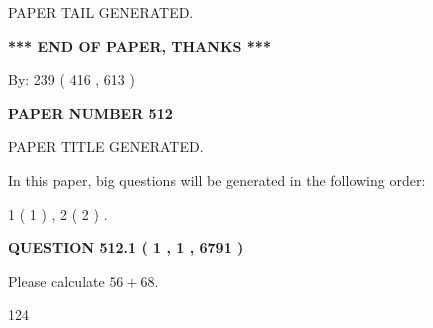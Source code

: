 \documentclass[12pt]{article}
\begin{document}
   
   
\vspace{2.0in} PAPER TAIL GENERATED.
   
   
   
   
\vspace{1.0in} 
{\textbf{\large{ *** END OF PAPER, THANKS *** }}} 
   
   
\hspace{1.0in} By: 
 239 ( 416 ,  613 )
   
   
   
   
\newpage 
\setcounter{page}{ 
   512001 } 
   
   
   
   
 {\textbf{ \Large{ PAPER NUMBER  512  }}}
   
   
\vspace{0.2in}
   
   
   
   
   
   
   
   
 \vspace{0.2in}
 
 
 
 
   
   
 PAPER TITLE GENERATED.
   
   
   
\vspace{0.2in}
   
In this paper, big questions will be generated in the following order: 
   
   
   1 ( 1 )
 ,
   2 ( 2 )
 .
  
\vspace{0.2in}
  
{\textbf{\Large{QUESTION
512.1 
 ( 1 , 1 , 6791 )
}}}
  
  
 
Please calculate $ %
56 +  %
68 $.
 
 
 
\noindent{}
 
 

124
 
 
\noindent{}
 
 

 
 
 
\noindent{}
 
\end{document}

